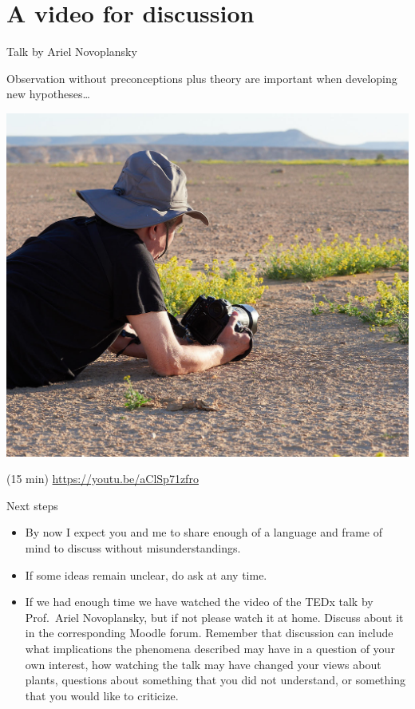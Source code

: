 \documentclass[10pt]{beamer}
\begin{document}
\section{A video for discussion}
\nocite{Falik2011,Falik2012,Novoplansky2021}

\begin{frame}{Talk by Ariel Novoplansky \Video}

Observation without preconceptions plus theory are important when developing new hypotheses\ldots

\includegraphics[width=0.5\linewidth]{photos/ariel}

 \Video (15 min) \url{https://youtu.be/aClSp71zfro}

\end{frame}


\begin{frame}{Next steps \Discussion}
\begin{itemize}
  \item By now I expect you and me to share enough of a language and frame of mind to discuss without misunderstandings.
  \item If some ideas remain unclear, do ask at any time.
  \item If we had enough time we have watched the video of the TEDx talk by Prof.\ Ariel Novoplansky, but if not please watch it at home. Discuss about it in the corresponding Moodle forum. Remember that discussion can include what implications the phenomena described may have in a question of your own interest, how watching the talk may have changed your views about plants, questions about something that you did not understand, or something that you would like to criticize.
\end{itemize}

\end{frame}
\end{document}
